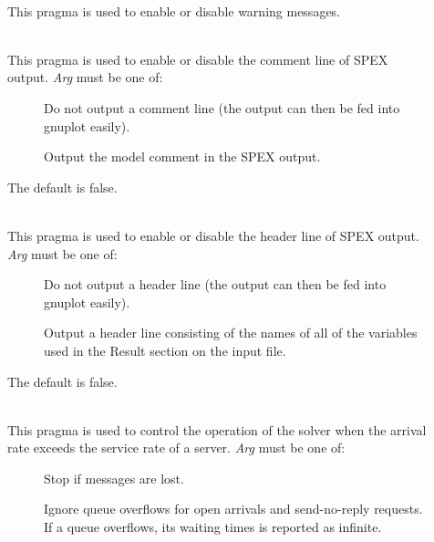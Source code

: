 \begin{description}
\item[]~\\
This pragma is used to enable or disable warning messages.
\begin{description}
\item[]
\item[]
\item[]
\item[]
\end{description}
\item[]~\\
This pragma is used to enable or disable the comment line of SPEX output.
\emph{Arg} must be one of: 
\begin{description}
\item[]
Do not output a comment line (the output can then be fed into gnuplot easily).
\item[]
Output the model comment in the SPEX output.
\end{description}
The default is false.
\item[]~\\
This pragma is used to enable or disable the header line of SPEX output.
\emph{Arg} must be one of: 
\begin{description}
\item[]
Do not output a header line (the output can then be fed into gnuplot easily).
\item[]
Output a header line consisting of the names of all of the variables used in the Result section on the input file.
\end{description}
The default is false.
\item[]~\\
This pragma is used to control the operation of the solver when the
arrival rate exceeds the service rate of a server.
\emph{Arg} must be one of: 
\begin{description}
\item[]
Stop if messages are lost.
\item[]
Ignore queue overflows for open arrivals and send-no-reply requests.  If a queue overflows, its waiting times is reported as infinite.\end{description}

\end{description}
